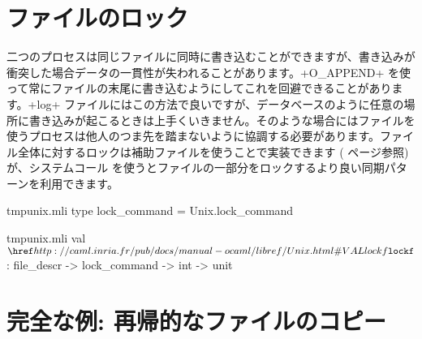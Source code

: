 \section{ファイルのロック}

二つのプロセスは同じファイルに同時に書き込むことができますが、書き込みが衝突した場合データの一貫性が失われることがあります。\ml+O_APPEND+ を使って常にファイルの末尾に書き込むようにしてこれを回避できることがあります。\ml+log+ ファイルにはこの方法で良いですが、データベースのように任意の場所に書き込みが起こるときは上手くいきません。そのような場合にはファイルを使うプロセスは他人のつま先を踏まないように協調する必要があります。ファイル全体に対するロックは補助ファイルを使うことで実装できます (\pageref{page/lock} ページ参照) が、システムコール  を使うとファイルの一部分をロックするより良い同期パターンを利用できます。
%
\begin{codefile}{tmpunix.mli}
type lock_command = Unix.lock_command
\end{codefile}
%
\begin{listingcodefile}{tmpunix.mli}
 val $\libvalue{Unix}{lockf}$ : file_descr -> lock_command -> int -> unit
\end{listingcodefile}


\section{\label{sec/copyrec}完全な例: 再帰的なファイルのコピー}


